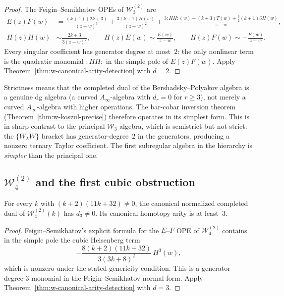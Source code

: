 \begin{proof}
The Feigin--Semikhatov OPEs of $\mathcal{W}_3^{(2)}$ are
\begin{align*}
E(z)F(w)
&= \frac{(k+1)(2k+3)}{(z-w)^3}
 + \frac{3(k+1)H(w)}{(z-w)^2}
 + \frac{3{:}HH{:}(w) - (k+3)T(w)
         + \tfrac{3}{2}(k+1)\partial H(w)}{z-w},
\\[4pt]
H(z)H(w)
&\sim \frac{2k+3}{3(z-w)^2}, \qquad
H(z)E(w) \sim \frac{E(w)}{z-w}, \qquad
H(z)F(w) \sim -\frac{F(w)}{z-w}.
\end{align*}
Every singular coefficient has generator degree at most~$2$: the
only nonlinear term is the quadratic monomial ${:}HH{:}$ in the
simple pole of $E(z)F(w)$.  Apply
Theorem~\ref{thm:w-canonical-arity-detection} with $d = 2$.
\end{proof}

\begin{remark}
\label{rem:w-bp-strictness-meaning}
Strictness means that the completed dual of the
Bershadsky--Polyakov algebra is a genuine dg algebra (a curved
$A_\infty$-algebra with $d_r = 0$ for $r \ge 3$), not merely a
curved $A_\infty$-algebra with higher operations.  The bar-cobar
inversion theorem (Theorem~\ref{thm:w-koszul-precise}) therefore
operates in its simplest form.  This is in sharp contrast to the
principal $\mathcal{W}_3$ algebra, which is semistrict but not
strict: the $\{W_\lambda W\}$ bracket has generator-degree~$2$ in
the generators, producing a nonzero ternary Taylor coefficient.  The
first subregular algebra in the hierarchy is \emph{simpler} than the
principal one.
\end{remark}

\subsection{$\mathcal{W}_4^{(2)}$ and the first cubic obstruction}
\label{subsec:w4-subregular-cubic}

\begin{theorem}
\label{thm:w-w4-cubic}
For every $k$ with $(k+2)(11k+32) \neq 0$, the canonical normalized
completed dual of $\mathcal{W}_4^{(2)}(k)$ has $d_3 \neq 0$.  Its
canonical homotopy arity is at least~$3$.
\end{theorem}

\begin{proof}
Feigin--Semikhatov's explicit formula for the $E$--$F$ OPE of
$\mathcal{W}_4^{(2)}$ contains in the simple pole the cubic
Heisenberg term
\[
-\frac{8(k+2)(11k+32)}{3(3k+8)^2}\,H^3(w),
\]
which is nonzero under the stated genericity condition.  This is a
generator-degree-$3$ monomial in the Feigin--Semikhatov normal form.
Apply Theorem~\ref{thm:w-canonical-arity-detection} with $d = 3$.
\end{proof}

